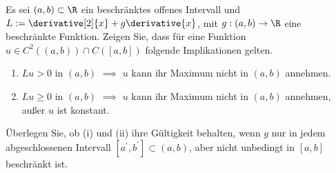 
\begin{exercise}

Es sei $(a, b) \subset \R$ ein beschränktes offenes Intervall und $L := \derivative[2]{x} + g \derivative{x}$, mit $g: (a, b) \to \R$ eine beschränkte Funktion.
Zeigen Sie, dass für eine Funktion $u \in C^2((a, b)) \cap C([a, b])$ folgende Implikationen gelten.

\begin{enumerate}[label = (\roman*)]
    \item $Lu > 0$ in $(a, b)$ $\implies$ $u$ kann ihr Maximum nicht in $(a, b)$ annehmen.
    \item $Lu \geq 0$ in $(a, b)$ $\implies$ $u$ kann ihr Maximum nicht in $(a, b)$ annehmen, außer $u$ ist konstant.
\end{enumerate}

Überlegen Sie, ob (i) und (ii) ihre Gültigkeit behalten, wenn $g$ nur in jedem abgeschlossenen Intervall $[a^\prime, b^\prime] \subset (a, b)$, aber nicht unbedingt in $[a, b]$ beschränkt ist.

\end{exercise}



